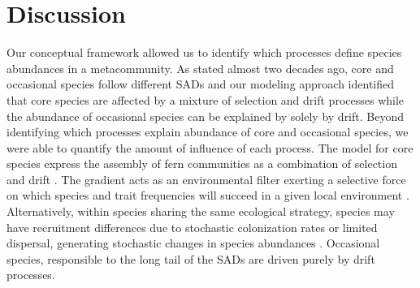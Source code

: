 \documentclass[12pt]{article}
\begin{document}

\section*{Discussion}



Our conceptual framework allowed us to identify which processes define species abundances in a metacommunity. As \cite{Magurran2003} stated almost two decades ago, core and occasional species follow different SADs and our modeling approach identified that core species are affected by a mixture of selection and drift processes while the abundance of occasional species can be explained by solely by drift. Beyond identifying which processes explain abundance of core and occasional species, we were able to quantify the amount of influence of each process. The model for core species express the assembly of fern communities as a combination of selection and drift \citep{Vellend2010}. The gradient acts as an environmental filter exerting a selective force on which species and trait frequencies will succeed in a given local environment \citep{Webb2010}.  Alternatively, within species sharing the same ecological strategy, species may have recruitment differences due to stochastic colonization rates or limited dispersal, generating stochastic changes in species abundances \citep{Gravel2006, Weiher2011}. Occasional species, responsible to the long tail of the SADs are driven purely by drift processes. %
\end{document}
